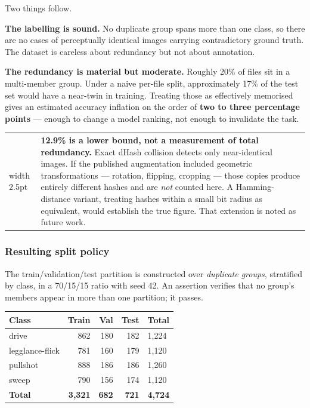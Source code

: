 \documentclass[11pt,a4paper]{article}
\makeatletter
\newenvironment{warnbox}
  {\par\medskip\noindent\begin{tabular}{@{}p{0.3em}@{\hspace{0.8em}}p{\dimexpr\linewidth-2.2em}@{}}
   {\color{warn}\vrule width 2.5pt} &}
  {\end{tabular}\par\medskip}
\makeatother
\begin{document}
Two things follow.

\textbf{The labelling is sound.} No duplicate group spans more than one class, so there
are no cases of perceptually identical images carrying contradictory ground truth. The
dataset is careless about redundancy but not about annotation.

\textbf{The redundancy is material but moderate.} Roughly 20\% of files sit in a
multi-member group. Under a naive per-file split, approximately 17\% of the test set
would have a near-twin in training. Treating those as effectively memorised gives an
estimated accuracy inflation on the order of \textbf{two to three percentage points}
--- enough to change a model ranking, not enough to invalidate the task.

\begin{warnbox}
\textbf{12.9\% is a lower bound, not a measurement of total redundancy.} Exact dHash
collision detects only near-identical images. If the published augmentation included
geometric transformations --- rotation, flipping, cropping --- those copies produce
entirely different hashes and are \emph{not} counted here. A Hamming-distance variant,
treating hashes within a small bit radius as equivalent, would establish the true figure.
That extension is noted as future work.
\end{warnbox}

\subsubsection{Resulting split policy}

The train/validation/test partition is constructed over \emph{duplicate groups},
stratified by class, in a 70/15/15 ratio with seed 42. An assertion verifies that no
group's members appear in more than one partition; it passes.

\begin{tabularx}{\linewidth}{@{}>{\ttfamily}p{3.8cm}rrrX@{}}
\toprule
\textnormal{\bfseries Class} & \textbf{Train} & \textbf{Val} & \textbf{Test} & \textbf{Total} \\
\midrule
drive           & 862 & 180 & 182 & 1{,}224 \\
legglance-flick & 781 & 160 & 179 & 1{,}120 \\
pullshot        & 888 & 186 & 186 & 1{,}260 \\
sweep           & 790 & 156 & 174 & 1{,}120 \\
\midrule
\textnormal{\bfseries Total} & \textbf{3{,}321} & \textbf{682} & \textbf{721} & \textbf{4{,}724} \\
\bottomrule
\end{tabularx}
\end{document}
